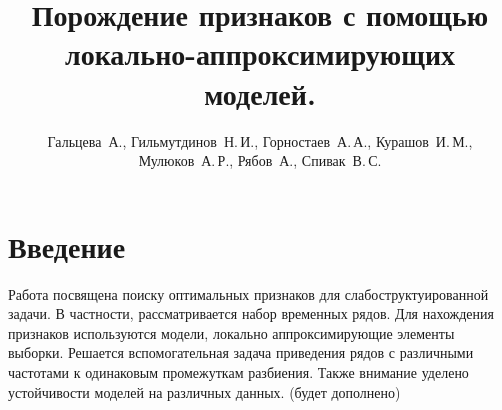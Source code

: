 \documentclass[12pt,twoside]{article}
\title
    [Порождение признаков с помощью локально-аппроксимирующих моделей.]
    {Порождение признаков с помощью локально-аппроксимирующих моделей.}
\author
    [Курашов~И.\,М.]
    {Гальцева~А., Гильмутдинов~Н.\,И., Горностаев~А.\,А., Курашов~И.\,М., Мулюков~А.\,Р., Рябов~А., Спивак~В.\,С.}
\begin{document}
\maketitle

\section{Введение}
Работа посвящена поиску оптимальных признаков для слабоструктуированной задачи. В частности, рассматривается набор временных рядов. Для нахождения признаков используются модели, локально аппроксимирующие элементы выборки.
Решается вспомогательная задача приведения рядов с различными частотами к одинаковым промежуткам разбиения.
Также внимание уделено устойчивости моделей на различных данных. (будет дополнено)



\nocite{journals/titb/MotrenkoS16}
\nocite{journals/titb/KarStr16}



\end{document}
